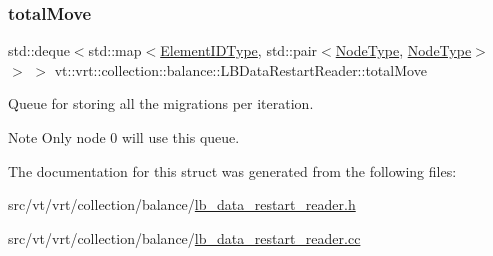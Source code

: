 \subsubsection{\texorpdfstring{total\+Move}{totalMove}}
{\footnotesize\ttfamily std\+::deque$<$std\+::map$<$\hyperlink{namespacevt_1_1vrt_1_1collection_1_1balance_a592736f733df4f90856df90a1fd08905}{Element\+I\+D\+Type}, std\+::pair$<$\hyperlink{namespacevt_a866da9d0efc19c0a1ce79e9e492f47e2}{Node\+Type}, \hyperlink{namespacevt_a866da9d0efc19c0a1ce79e9e492f47e2}{Node\+Type}$>$ $>$ $>$ vt\+::vrt\+::collection\+::balance\+::\+L\+B\+Data\+Restart\+Reader\+::total\+Move\hspace{0.3cm}{\ttfamily [private]}}



Queue for storing all the migrations per iteration. 

\begin{DoxyNote}{Note}
Only node 0 will use this queue. 
\end{DoxyNote}


The documentation for this struct was generated from the following files\+:\begin{DoxyCompactItemize}
\item 
src/vt/vrt/collection/balance/\hyperlink{lb__data__restart__reader_8h}{lb\+\_\+data\+\_\+restart\+\_\+reader.\+h}\item 
src/vt/vrt/collection/balance/\hyperlink{lb__data__restart__reader_8cc}{lb\+\_\+data\+\_\+restart\+\_\+reader.\+cc}\end{DoxyCompactItemize}
